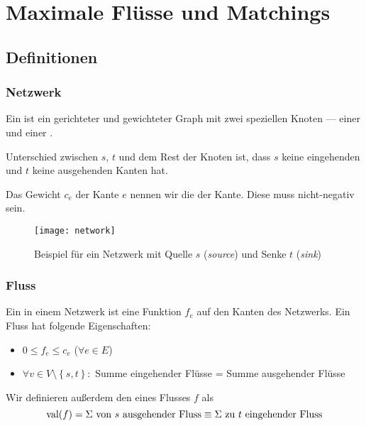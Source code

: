 \chapter{Maximale Flüsse und Matchings}

\newcommand{\pluseq}{\mathrel{+}=}
\newcommand{\minuseq}{\mathrel{-}=}

\section{Definitionen}

\subsection{Netzwerk}

Ein  ist ein gerichteter und gewichteter Graph mit zwei speziellen Knoten --- einer  und einer .

Unterschied zwischen \( s \), \( t \) und dem Rest der Knoten ist, dass \( s \) keine eingehenden und \( t \) keine ausgehenden Kanten hat. 

Das Gewicht \( c_e \) der Kante \( e \) nennen wir die  der Kante. Diese muss nicht-negativ sein.

\begin{figure}[H]
  \texttt{[image: network]}
  \caption{Beispiel für ein Netzwerk mit Quelle \( s \) (\emph{source}) und Senke \( t \) (\emph{sink})}
\end{figure}

\subsection{Fluss}

Ein  in einem Netzwerk ist eine Funktion \( f_e \) auf den Kanten des Netzwerks. Ein Fluss hat folgende Eigenschaften:

\begin{itemize}
  \item \( 0 \leq f_e \leq c_e \) (\( \forall e \in E \))
  \item \( \forall v \in V \setminus \left \{ s,t \right \} : \) Summe eingehender Flüsse = Summe ausgehender Flüsse
\end{itemize}

Wir definieren außerdem den  eines Flusses \( f \) als
\begin{equation*}
  \text{val}(f) = \Sigma \text{ von \( s \) ausgehender Fluss} \equiv \Sigma \text{ zu \( t \) eingehender Fluss}
\end{equation*}

